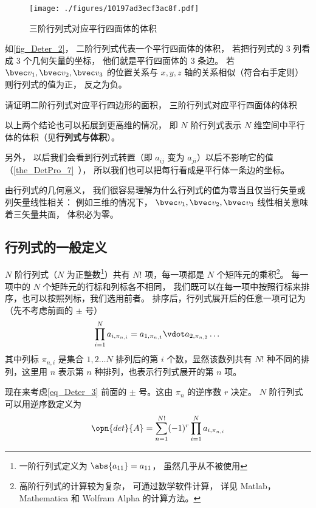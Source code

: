 \begin{figure}[ht]
\centering
\texttt{[image: ./figures/10197ad3ecf3ac8f.pdf]}
\caption{三阶行列式对应平行四面体的体积} \label{fig_Deter_2}
\end{figure}
如\autoref{fig_Deter_2}， 二阶行列式代表一个平行四面体的体积， 若把行列式的 3 列看成 3 个几何矢量的坐标， 他们就是平行四面体的 3 条边。 若 $\bvec v_1, \bvec v_2, \bvec v_3$ 的位置关系与 $x, y, z$ 轴的关系相似（符合右手定则） 则行列式的值为正， 反之为负。

\begin{exercise}{}
请证明二阶行列式对应平行四边形的面积， 三阶行列式对应平行四面体的体积
\end{exercise}

以上两个结论也可以拓展到更高维的情况， 即 $N$ 阶行列式表示 $N$ 维空间中平行体的体积（见\textbf{行列式与体积}）。

另外， 以后我们会看到行列式转置（即 $a_{ij}$ 变为 $a_{ji}$）以后不影响它的值（\autoref{the_DetPro_7}~）， 所以我们也可以把每行看成是平行体一条边的坐标。

由行列式的几何意义， 我们很容易理解为什么行列式的值为零当且仅当行矢量或列矢量线性相关： 例如三维的情况下， $\bvec v_1, \bvec v_2, \bvec v_3$ 线性相关意味着三矢量共面， 体积必为零。

\subsection{行列式的一般定义}


$N$ 阶行列式（$N$ 为正整数\footnote{一阶行列式定义为 $\abs{a_{11}}=a_{11}$， 虽然几乎从不被使用}）共有 $N!$ 项，每一项都是 $N$ 个矩阵元的乘积\footnote{高阶行列式的计算较为复杂， 可通过数学软件计算， 详见 Matlab，Mathematica 和 Wolfram Alpha 的计算方法。%
}。 每一项中的 $N$ 个矩阵元的行标和列标各不相同， 我们既可以在每一项中按照行标来排序，也可以按照列标，我们选用前者。 排序后，行列式展开后的任意一项可记为（先不考虑前面的 $\pm$ 号）
\begin{equation}\label{eq_Deter_3}
\prod_{i=1}^N a_{i,\pi_{n,i}} = 
a_{1,\pi_{n,1}} \vdot a_{2,\pi_{n,2}} \dots
\end{equation}
其中列标 $\pi_{n,i}$ 是集合 ${1,2 \dots N}$ 排列后的第 $i$ 个数，显然该数列共有 $N!$ 种不同的排列，这里用 $n$ 表示第 $n$ 种排列，也表示行列式展开的第 $n$ 项。

现在来考虑\autoref{eq_Deter_3} 前面的 $\pm$ 号。这由 $\pi_n$ 的逆序数 $r$ 决定。 $N$ 阶行列式可以用逆序数定义为
\begin{equation}\label{eq_Deter_4}
\opn{det}{A} = \sum_{n=1}^{N!} (-1)^{r} \prod_{i=1}^N a_{i,\pi_{n,i}}
\end{equation}

